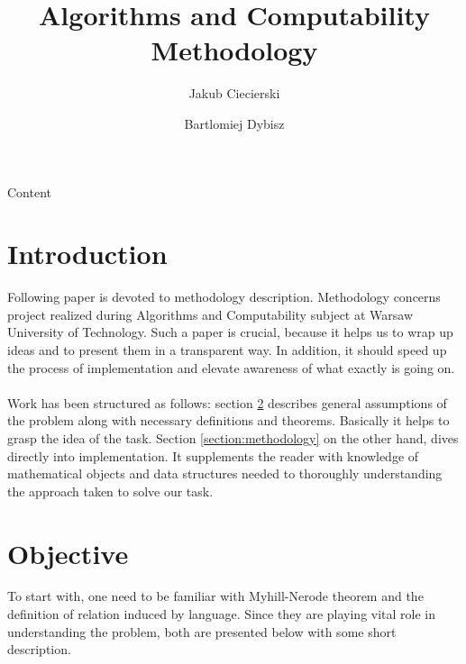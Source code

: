 \documentclass[runningheads,a4paper]{llncs}
\begin{document}
\vspace{-100pt}
\mainmatter

\title{Algorithms and Computability \\Methodology}


\author{Jakub Ciecierski \and Bartlomiej Dybisz}




\maketitle

\abstract{} Content \\


\section{Introduction}
Following paper is devoted to methodology description. Methodology concerns project realized during Algorithms and Computability subject at Warsaw University of Technology. Such a paper is crucial, because it helps us to wrap up ideas and to present them in a transparent way. In addition, it should speed up the process of implementation and elevate awareness of what exactly is going on.
\paragraph{}
Work has been structured as follows: section \ref{section:objectives} describes general assumptions of the problem along with necessary definitions and theorems. Basically it helps to grasp the idea of the task.
Section \ref{section:methodology} on the other hand, dives directly into implementation. It supplements the reader with knowledge of mathematical objects and data structures needed to thoroughly understanding the approach taken to solve our task. 

\section{Objective} \label{section:objectives}
To start with, one need to be familiar with Myhill-Nerode theorem and the definition of relation induced by language. Since they are playing vital role in understanding the problem, both are presented below with some short description. 
\end{document}
